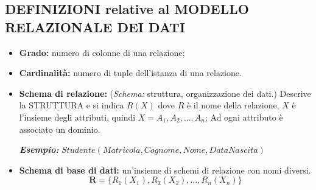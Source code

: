 \documentclass{article}
\begin{document}
\subsection{DEFINIZIONI relative al MODELLO RELAZIONALE DEI DATI}
\begin{itemize}
    \item \textbf{Grado:} numero di colonne di una relazione;
    \item \textbf{Cardinalità:} numero di tuple dell'istanza di una relazione.

    \item \textbf{Schema di relazione:} \small(\textit{Schema:} struttura, organizzazione dei dati.) \normalsize Descrive la STRUTTURA  e si indica $R(X)$ dove $R$ è il nome della relazione, $X$ è l'insieme degli attributi, quindi $X = {A_1, A_2, ..., A_n}$; Ad ogni attributo è associato un dominio. 
    
    \textit{\textbf{Esempio:}} $Studente(Matricola,Cognome, Nome, DataNascita)$
    \item \textbf{Schema di base di dati:} un'insieme di schemi di relazione con nomi diversi.
    \begin{equation*}
        \boldsymbol{R}= \{  R_1(X_1), R_2(X_2), ..., R_n(X_n) \}
    \end{equation*}


\end{itemize}
\end{document}
